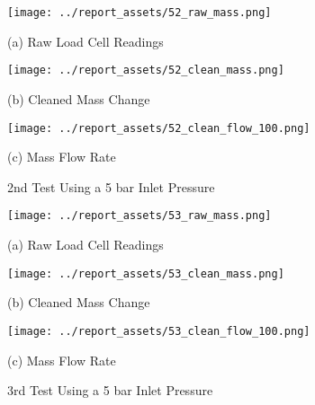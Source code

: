 \begin{figure}[htbp]
    \centering

    \begin{minipage}{0.32\textwidth}
        \centering
        \texttt{[image: ../report\_assets/52\_raw\_mass.png]}
        \caption*{(a) Raw Load Cell Readings}
    \end{minipage}
    \hfill
    \begin{minipage}{0.32\textwidth}
        \centering
        \texttt{[image: ../report\_assets/52\_clean\_mass.png]}
        \caption*{(b) Cleaned Mass Change}
    \end{minipage}
    \hfill
    \begin{minipage}{0.32\textwidth}
        \centering
        \texttt{[image: ../report\_assets/52\_clean\_flow\_100.png]}
        \caption*{(c) Mass Flow Rate}
    \end{minipage}
    \caption{2nd Test Using a 5 bar Inlet Pressure}\label{fig:52}
    
\end{figure}
\vfill

\begin{figure}[htbp]
    \centering

    \begin{minipage}{0.32\textwidth}
        \centering
        \texttt{[image: ../report\_assets/53\_raw\_mass.png]}
        \caption*{(a) Raw Load Cell Readings}
    \end{minipage}
    \hfill
    \begin{minipage}{0.32\textwidth}
        \centering
        \texttt{[image: ../report\_assets/53\_clean\_mass.png]}
        \caption*{(b) Cleaned Mass Change}
    \end{minipage}
    \hfill
    \begin{minipage}{0.32\textwidth}
        \centering
        \texttt{[image: ../report\_assets/53\_clean\_flow\_100.png]}
        \caption*{(c) Mass Flow Rate}
    \end{minipage}
    \caption{3rd Test Using a 5 bar Inlet Pressure}
    
\end{figure}\label{fig:53}
\vfill
\newpage

